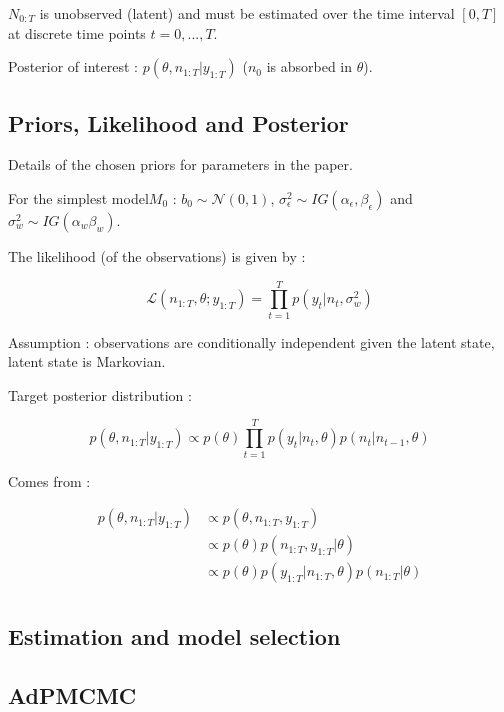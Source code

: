 \documentclass[10pt,a4paper]{article}
\begin{document}
$N_{0:T}$ is unobserved (latent) and must be estimated over the time interval $[0, T]$ at discrete time points $t=0, ..., T$.

Posterior of interest : $p(\theta, n_{1:T} | y_{1:T})$
($n_0$ is absorbed in $\theta$).

\subsection{Priors, Likelihood and Posterior}

Details of the chosen priors for parameters in the paper.

For the simplest model$M_0$ :  $b_0 \sim \mathcal{N}(0,1)$, $\sigma_\epsilon^2 \sim IG(\alpha_\epsilon, \beta_\epsilon)$ and $\sigma_w^2 \sim IG(\alpha_w \beta_w)$.

The likelihood (of the observations) is given by :

\begin{equation}
\mathcal{L}(n_{1:T}, \theta ; y_{1:T}) = \displaystyle\prod_{t=1}^T p(y_t | n_t, \sigma_w^2)
\end{equation}

Assumption : observations are conditionally independent given the latent state, latent state is Markovian.

Target posterior distribution :

\begin{equation}
p(\theta, n_{1:T} |y_{1:T}) \propto p(\theta)\displaystyle\prod_{t=1}^T p(y_t|n_t, \theta) p(n_t |n_{t-1}, \theta)
\end{equation}

Comes from :

\begin{equation}
\begin{split}
p(\theta, n_{1:T} | y_{1:T}) &\propto  p(\theta, n_{1:T}, y_{1:T}) \\
&\propto p(\theta)p(n_{1:T}, y_{1:T} | \theta) \\
&\propto p(\theta)p(y_{1:T} | n_{1:T}, \theta) p(n_{1:T} | \theta)\\
\end{split}
\end{equation}

\subsection{Estimation and model selection}

\subsection{AdPMCMC}
\end{document}
